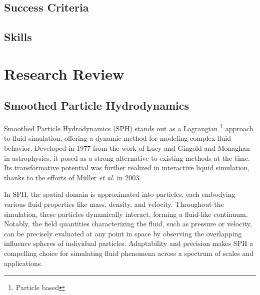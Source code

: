 \documentclass[a4paper,11pt]{article}
\begin{document}
\begin{multicols}{2}
\subsection{Success Criteria}
\subsection{Skills}


\section{Research Review}
\subsection{Smoothed Particle Hydrodynamics}
Smoothed Particle Hydrodynamics (SPH) stands out as a Lagrangian \footnote{Particle based} approach to fluid simulation, offering a dynamic method for modeling complex fluid behavior. Developed in 1977 from the work of Lucy \cite{lucy} and Gingold and Monaghan \cite{gingold} in astrophysics, it posed as a strong alternative to existing methods at the time. Its transformative potential was further realized in interactive liquid simulation, thanks to the efforts of Müller \textit{et al.} \cite{muller} in 2003.

In SPH, the spatial domain is approximated into particles, each embodying various fluid properties like mass, density, and velocity. Throughout the simulation, these particles dynamically interact, forming a fluid-like continuum. Notably, the field quantities characterizing the fluid, such as pressure or velocity, can be precisely evaluated at any point in space by observing the overlapping influence spheres of individual particles. Adaptability and precision makes SPH a compelling choice for simulating fluid phenomena across a spectrum of scales and applications.


\end{multicols}
\end{document}

